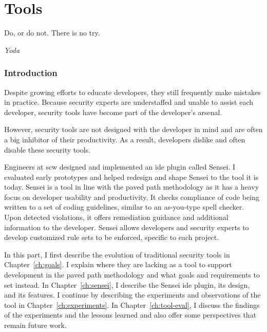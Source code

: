 \part{Tools}
\label{p:tools}
\epigraph{Do, or do not. There is no try.}{\textit{Yoda}}

\clearpage
\section*{Introduction}

Despite growing efforts to educate developers, they still frequently make mistakes in practice.
Because security experts are understaffed and unable to assist each developer, security tools have become part of the developer's arsenal.

However, security tools are not designed with the developer in mind and are often a big inhibitor of their productivity. As a result, developers dislike and often disable these security tools. 


Engineers at \gls{scw} designed and implemented an \gls{ide} plugin called Sensei.
I evaluated early prototypes and helped redesign and shape Sensei to the tool it is today.
Sensei is a tool in line with the paved path methodology as it has a heavy focus on developer usability and productivity.
It checks compliance of code being written to a set of coding guidelines, similar to an as-you-type spell checker.
Upon detected violations, it offers remediation guidance and additional information to the developer.
Sensei allows developers and security experts to develop customized rule sets to be enforced, specific to each project.

In this part, I first describe the evolution of traditional security tools in Chapter~\ref{ch:goals}.
I explain where they are lacking as a tool to support development in the paved path methodology and what goals and requirements to set instead.
In Chapter~\ref{ch:sensei}, I describe the Sensei \gls{ide} plugin, its design, and its features.
I continue by describing the experiments and observations of the tool in Chapter~\ref{ch:experiments}.
In Chapter~\ref{ch:tool-eval}, I discuss the findings of the experiments and the lessons learned and also offer some perspectives that remain future work.

